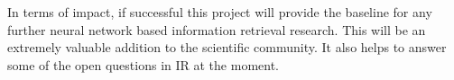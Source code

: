 \documentclass[11pt,english,twocolumn]{article}
\begin{document}
In terms of impact, if successful this project will provide the baseline for any further neural network based information retrieval research. This will be an extremely valuable addition to the scientific community. It also helps to answer some of the open questions in IR at the moment.








\let\oldbibliography\thebibliography
\renewcommand{\thebibliography}[1]{\oldbibliography{#1}
\setlength{\itemsep}{-3pt}}


{
\scriptsize

}
\end{document}
